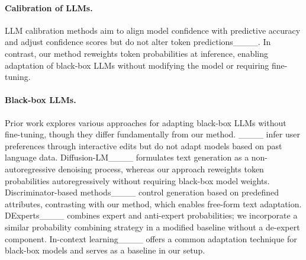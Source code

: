 \paragraph{Calibration of LLMs.}  
LLM calibration methods aim to align model confidence with predictive accuracy and adjust confidence scores but do not alter token predictions____. In contrast, our method reweights token probabilities at inference, enabling adaptation of black-box LLMs without modifying the model or requiring fine-tuning.

\paragraph{Black-box LLMs.}  
Prior work explores various approaches for adapting black-box LLMs without fine-tuning, though they differ fundamentally from our method. ____ infer user preferences through interactive edits but do not adapt models based on past language data. Diffusion-LM____ formulates text generation as a non-autoregressive denoising process, whereas our approach reweights token probabilities autoregressively without requiring black-box model weights. Discriminator-based methods____ control generation based on predefined attributes, contrasting with our method, which enables free-form text adaptation. DExperts____ combines expert and anti-expert probabilities; we incorporate a similar probability combining strategy in a modified baseline without a de-expert component. In-context learning____ offers a common adaptation technique for black-box models and serves as a baseline in our setup.

